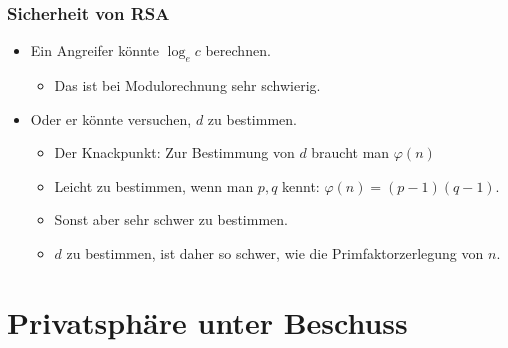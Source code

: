 \documentclass{beamer}
\begin{document}
\begin{frame}
\frametitle{Sicherheit von RSA}

\begin{itemize}
	\item Ein Angreifer könnte \(\log_e c\) berechnen.
	\begin{itemize}
	\item Das ist bei Modulorechnung sehr schwierig.
	\end{itemize}
\pause	\item Oder er könnte versuchen, \(d\) zu bestimmen.
	\begin{itemize}
	\item Der Knackpunkt: Zur Bestimmung von \(d\) braucht man \(\varphi(n)\)
	\item Leicht zu bestimmen, wenn man \(p,q\) kennt: \(\varphi(n)=(p-1)(q-1)\).
	\item Sonst aber sehr schwer zu bestimmen.
	\item \(d\) zu bestimmen, ist daher so schwer, wie die Primfaktorzerlegung von \(n\).
	\end{itemize}
\end{itemize}
\end{frame}

\section{Privatsphäre unter Beschuss}
\end{document}
